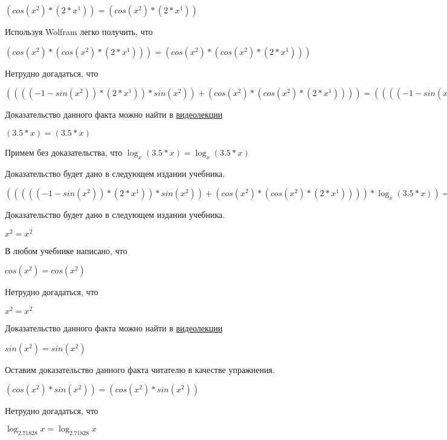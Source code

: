 \documentclass[12pt,a4paper,fleqn]{article}
\theoremstyle{definition}
\begin{document}
$(cos({ x }^{ 2 }) * ( 2  * { x }^{ 1 })) = (cos({ x }^{ 2 }) * ( 2  * { x }^{ 1 }))$

Используя Wolfram легко получить, что

$(cos({ x }^{ 2 }) * (cos({ x }^{ 2 }) * ( 2  * { x }^{ 1 }))) = (cos({ x }^{ 2 }) * (cos({ x }^{ 2 }) * ( 2  * { x }^{ 1 })))$

Нетрудно догадаться, что

$(((( -1  - sin({ x }^{ 2 })) * ( 2  * { x }^{ 1 })) * sin({ x }^{ 2 })) + (cos({ x }^{ 2 }) * (cos({ x }^{ 2 }) * ( 2  * { x }^{ 1 })))) = (((( -1  - sin({ x }^{ 2 })) * ( 2  * { x }^{ 1 })) * sin({ x }^{ 2 })) + (cos({ x }^{ 2 }) * (cos({ x }^{ 2 }) * ( 2  * { x }^{ 1 }))))$

Доказательство данного факта можно найти в \href{https://www.youtube.com/watch?v=dQw4w9WgXcQ}{видеолекции}

$( 3.5  *  x ) = ( 3.5  *  x )$

Примем без доказательства, что
$\log_{ x }{( 3.5  *  x )} = \log_{ x }{( 3.5  *  x )}$

Доказательство будет дано в следующем издании учебника.

$((((( -1  - sin({ x }^{ 2 })) * ( 2  * { x }^{ 1 })) * sin({ x }^{ 2 })) + (cos({ x }^{ 2 }) * (cos({ x }^{ 2 }) * ( 2  * { x }^{ 1 })))) * \log_{ x }{( 3.5  *  x )}) = ((((( -1  - sin({ x }^{ 2 })) * ( 2  * { x }^{ 1 })) * sin({ x }^{ 2 })) + (cos({ x }^{ 2 }) * (cos({ x }^{ 2 }) * ( 2  * { x }^{ 1 })))) * \log_{ x }{( 3.5  *  x )})$

Доказательство будет дано в следующем издании учебника.

${ x }^{ 2 } = { x }^{ 2 }$

В любом учебнике написано, что

$cos({ x }^{ 2 }) = cos({ x }^{ 2 })$

Нетрудно догадаться, что

${ x }^{ 2 } = { x }^{ 2 }$

Доказательство данного факта можно найти в \href{https://www.youtube.com/watch?v=dQw4w9WgXcQ}{видеолекции}

$sin({ x }^{ 2 }) = sin({ x }^{ 2 })$

Оставим доказательство данного факта читателю в качестве упражнения.

$(cos({ x }^{ 2 }) * sin({ x }^{ 2 })) = (cos({ x }^{ 2 }) * sin({ x }^{ 2 }))$

Нетрудно догадаться, что

$\log_{ 2.71828 }{ x } = \log_{ 2.71828 }{ x }$
\end{document}
